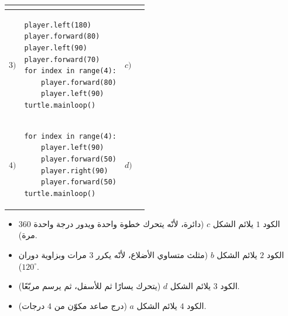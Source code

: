 \documentclass[14pt]{extarticle}
\begin{document}
\begin{enumerate}[resume, label=\textbf{السؤال \arabic*:}, wide=0pt, itemsep=2.2em]
{\begin{longtable}{|C{0.9cm}|p{7.2cm}|C{0.9cm}|C{5.2cm}|}
\begin{english}
\end{english}
\\ \hline
$3)$ &
\begin{pycell}
\begin{english}
\begin{verbatim}
player.left(180)
player.forward(80)
player.left(90)
player.forward(70)
for index in range(4):
    player.forward(80)
    player.left(90)
turtle.mainloop()
\end{verbatim}
\end{english}
\end{pycell}
& $c)$ &
\begin{english}
\vspace{0.1cm}
\end{english}
\\ \hline
$4)$ &
\begin{pycell}
\begin{english}
\begin{verbatim}
for index in range(4):
    player.left(90)
    player.forward(50)
    player.right(90)
    player.forward(50)
turtle.mainloop()
\end{verbatim}
\end{english}
\end{pycell}
& $d)$ &
\begin{english}
\vspace{0.1cm}
\end{english}
\\ \hline
\end{longtable}}

\ifwithsols
\begin{boxSolution}
\begin{itemize}
\item الكود $1$ يلائم الشكل $c$ (دائرة، لأنّه يتحرك خطوة واحدة ويدور درجة واحدة $360$ مرة).
\item الكود $2$ يلائم الشكل $b$ (مثلث متساوي الأضلاع، لأنّه يكرر $3$ مرات وبزاوية دوران $120^\circ$).
\item الكود $3$ يلائم الشكل $d$ (يتحرك يسارًا ثم للأسفل، ثم يرسم مربّعًا).
\item الكود $4$ يلائم الشكل $a$ (درج صاعد مكوّن من $4$ درجات).
\end{itemize}
\end{boxSolution}
\fi
\filbreak


\end{enumerate}
\end{document}
